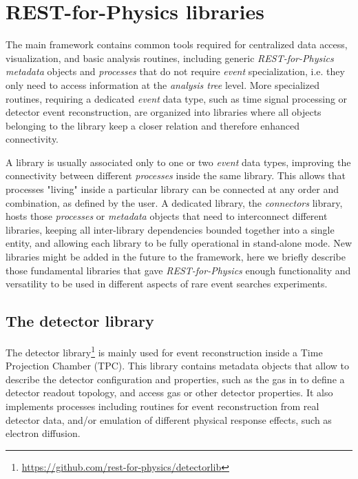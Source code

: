 \section{REST-for-Physics libraries}

\label{sec:libraries}

The main framework contains common tools required for centralized data access, visualization, and basic analysis routines, including generic \emph{REST-for-Physics} \emph{metadata} objects and \emph{processes} that do not require \emph{event} specialization, i.e. they only need to access information at the \emph{analysis tree} level. More specialized routines, requiring a dedicated \emph{event} data type, such as time signal processing or detector event reconstruction, are organized into libraries where all objects belonging to the library keep a closer relation and therefore enhanced connectivity. 

A library is usually associated only to one or two \emph{event} data types, improving the connectivity between different \emph{processes} inside the same library. This allows that processes "living" inside a particular library can be connected at any order and combination, as defined by the user. A dedicated library, the \emph{connectors} library, hosts those \emph{processes} or \emph{metadata} objects that need to interconnect different libraries, keeping all inter-library dependencies bounded together into a single entity, and allowing each library to be fully operational in stand-alone mode. New libraries might be added in the future to the framework, here we briefly describe those fundamental libraries that gave \emph{REST-for-Physics} enough functionality and versatility to be used in different aspects of rare event searches experiments.

\subsection{The detector library}

The detector library\footnote{\url{https://github.com/rest-for-physics/detectorlib}} is mainly used for event reconstruction inside a Time Projection Chamber (TPC). This library contains metadata objects that allow to describe the detector configuration and properties, such as the gas   in to define a detector readout topology, and access gas or other detector properties. It also implements processes including routines for event reconstruction from real detector data, and/or emulation of different physical response effects, such as electron diffusion.

